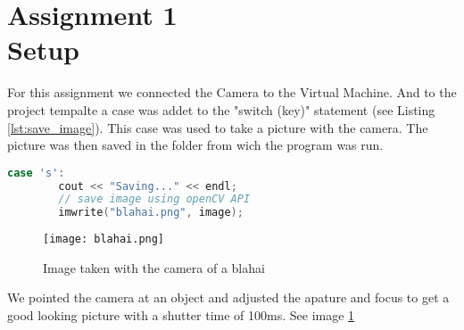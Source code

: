 \section {Assignment 1 \\ {Setup}}
\label {sec:assignment_1}

For this assignment we connected the Camera to the Virtual Machine. And to the project tempalte a case was addet to the "switch (key)" statement (see Listing \ref{lst:save_image}). This case was used to take a picture with the camera. The picture was then saved in the folder from wich the program was run.

\begin{lstlisting}[language=C, caption=save image to file, label=lst:save_image]
    case 's':
        cout << "Saving..." << endl;
        // save image using openCV API
        imwrite("blahai.png", image);
\end{lstlisting}

\begin{figure}[h!]
    \centering
    \texttt{[image: blahai.png]}
    \caption{Image taken with the camera of a blahai}
    \label{fig:blahai}
  \end{figure}

We pointed the camera at an object and adjusted the apature and focus to get a good looking picture with a shutter time of 100ms. See image \ref{fig:blahai}
